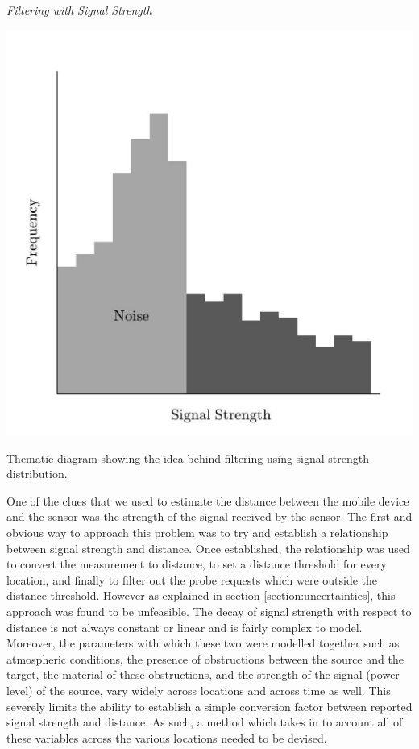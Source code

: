 \vspace{1.5em}\noindent\textit{Filtering with Signal Strength}\vspace{0.5em}

\begin{marginfigure}
  \includegraphics[trim={5 5 5 5},clip]{images/processing-method-signal.jpg}
  \caption{Thematic diagram showing the idea behind filtering using signal strength distribution.}
  \label{figure:processing:method:signal}
\end{marginfigure}

One of the clues that we used to estimate the distance between the mobile device and the sensor was the strength of the signal received by the sensor.
The first and obvious way to approach this problem was to try and establish a relationship between signal strength and distance.
Once established, the relationship was used to convert the measurement to distance, to set a distance threshold for every location, and finally to filter out the probe requests which were outside the distance threshold.
However as explained in section \ref{section:uncertainties}, this approach was found to be unfeasible.
The decay of signal strength with respect to distance is not always constant or linear and is fairly complex to model.
Moreover, the parameters with which these two were modelled together such as atmospheric conditions, the presence of obstructions between the source and the target, the material of these obstructions, and the strength of the signal (power level) of the source, vary widely across locations and across time as well.
This severely limits the ability to establish a simple conversion factor between reported signal strength and distance.
As such, a method which takes in to account all of these variables across the various locations needed to be devised.

